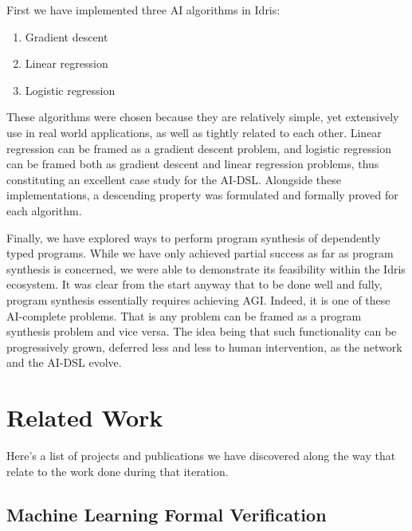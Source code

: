 \documentclass[]{report}
\begin{document}
First we have implemented three AI algorithms in Idris:
\begin{enumerate}
\item Gradient descent
\item Linear regression
\item Logistic regression
\end{enumerate}
These algorithms were chosen because they are relatively simple, yet
extensively use in real world applications, as well as tightly related
to each other.  Linear regression can be framed as a gradient descent
problem, and logistic regression can be framed both as gradient
descent and linear regression problems, thus constituting an excellent
case study for the AI-DSL.  Alongside these implementations, a
descending property was formulated and formally proved for each
algorithm.

Finally, we have explored ways to perform program synthesis of
dependently typed programs.  While we have only achieved partial
success as far as program synthesis is concerned, we were able to
demonstrate its feasibility within the Idris ecosystem.  It was clear
from the start anyway that to be done well and fully, program
synthesis essentially requires achieving AGI.  Indeed, it is one of
these AI-complete problems.  That is any problem can be framed as a
program synthesis problem and vice versa.  The idea being that such
functionality can be progressively grown, deferred less and less to
human intervention, as the network and the AI-DSL evolve.

\section{Related Work}

Here's a list of projects and publications we have discovered along
the way that relate to the work done during that iteration.

\subsection{Machine Learning Formal Verification}
\end{document}
